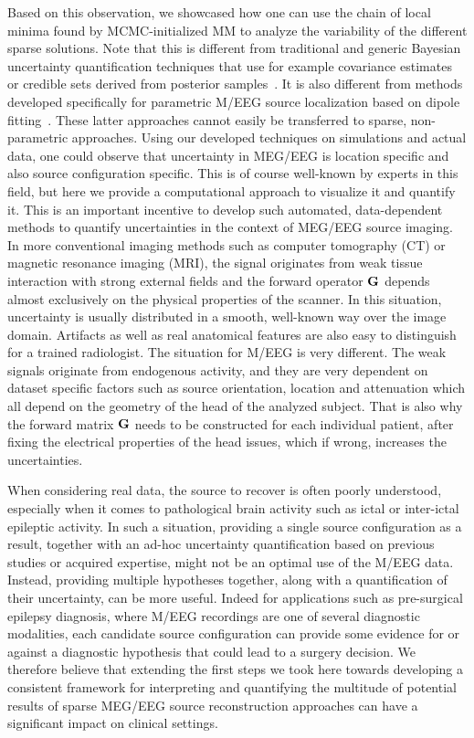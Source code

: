 Based on this observation, we showcased how one can use the chain of local minima found by MCMC-initialized MM to analyze the variability of the different sparse solutions. Note that this is different from traditional and generic Bayesian uncertainty quantification techniques that use for example covariance estimates or credible sets derived from posterior samples~\cite{szabo2015frequentist}. It is also different from methods developed specifically for parametric M/EEG source localization based on dipole fitting~\cite{Fuchs20041442,Darvas2005355}. These latter approaches cannot easily be transferred to sparse, non-parametric approaches. Using our developed techniques on simulations and actual data, one could observe that uncertainty in MEG/EEG is location specific and also source configuration specific. This is of course well-known by experts in this field, but here we provide a computational approach to visualize it and quantify it.
This is an important incentive to develop such automated, data-dependent methods to quantify uncertainties in the context of MEG/EEG source imaging. In more conventional imaging methods such as computer tomography (CT) or magnetic resonance imaging (MRI), the signal originates from weak tissue interaction with strong external fields and the forward operator $\mathbf{G}$ depends almost exclusively on the physical properties of the scanner. In this situation, uncertainty is usually distributed in a smooth, well-known way over the image domain. Artifacts as well as real anatomical features are also easy to distinguish for a trained radiologist. The situation for M/EEG is very different. The weak signals originate from endogenous activity, and they are very dependent on dataset specific factors such as source orientation, location and attenuation which all depend on the geometry of the head of the analyzed subject. That is also why the forward matrix $\mathbf{G}$ needs to be constructed for each individual patient, after fixing the electrical properties of the head issues, which if wrong, increases the uncertainties.

When considering real data, the source to recover is often poorly understood, especially when it comes to pathological brain activity such as ictal or inter-ictal epileptic activity. In such a situation, providing a single source configuration as a result, together with an ad-hoc uncertainty quantification based on previous studies or acquired expertise, might not be an optimal use of the M/EEG data.
Instead, providing multiple hypotheses together, along with a quantification of their uncertainty, can be more useful. Indeed for applications such as pre-surgical epilepsy diagnosis, where M/EEG recordings are one of several diagnostic modalities, each candidate source configuration can provide some evidence for or against a diagnostic hypothesis that could lead to a surgery decision.
We therefore believe that extending the first steps we took here towards developing a consistent framework for interpreting and quantifying the multitude of potential results of sparse MEG/EEG source reconstruction approaches can have a significant impact on clinical settings.
